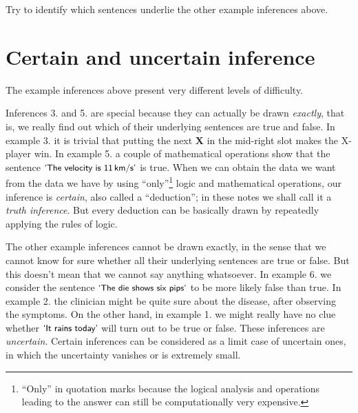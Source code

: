 \documentclass[
  a4paper,
  DIV=11,
  numbers=noendperiod,
  oneside]{scrreprt}
\begin{document}
\begin{tcolorbox}[enhanced jigsaw, bottomrule=.15mm, leftrule=.75mm, opacitybacktitle=0.6, breakable, toptitle=1mm, coltitle=black, title={Exercise}, rightrule=.15mm, left=2mm, colframe=quarto-callout-caution-color-frame, bottomtitle=1mm, arc=.35mm, titlerule=0mm, toprule=.15mm, opacityback=0, colback=white, colbacktitle=quarto-callout-caution-color!10!white]

Try to identify which sentences underlie the other example inferences
above.

\end{tcolorbox}

\hypertarget{certain-and-uncertain-inference}{%
\section{Certain and uncertain
inference}\label{certain-and-uncertain-inference}}

The example inferences above present very different levels of
difficulty.

Inferences 3. and 5. are special because they can actually be drawn
\emph{exactly}, that is, we really find out which of their underlying
sentences are true and false. In example 3. it is trivial that putting
the next {\textbf{X}} in the mid-right slot makes the X-player win. In
example 5. a couple of mathematical operations show that the sentence
\(\textsf{\small`The velocity is 11\,km/s'}\) is true. When we can
obtain the data we want from the data we have by using
``only''\footnote{``Only'' in quotation marks because the logical
  analysis and operations leading to the answer can still be
  computationally very expensive.} logic and mathematical operations,
our inference is \emph{certain}, also called a ``deduction''; in these
notes we shall call it a \emph{truth inference}. But every deduction can
be basically drawn by repeatedly applying the rules of logic.

The other example inferences cannot be drawn exactly, in the sense that
we cannot know for sure whether all their underlying sentences are true
or false. But this doesn't mean that we cannot say anything whatsoever.
In example 6. we consider the sentence
\(\textsf{\small`The die shows six pips'}\) to be more likely false than
true. In example 2. the clinician might be quite sure about the disease,
after observing the symptoms. On the other hand, in example 1. we might
really have no clue whether \(\textsf{\small`It rains today'}\) will
turn out to be true or false. These inferences are \emph{uncertain}.
Certain inferences can be considered as a limit case of uncertain ones,
in which the uncertainty vanishes or is extremely small.
\end{document}
